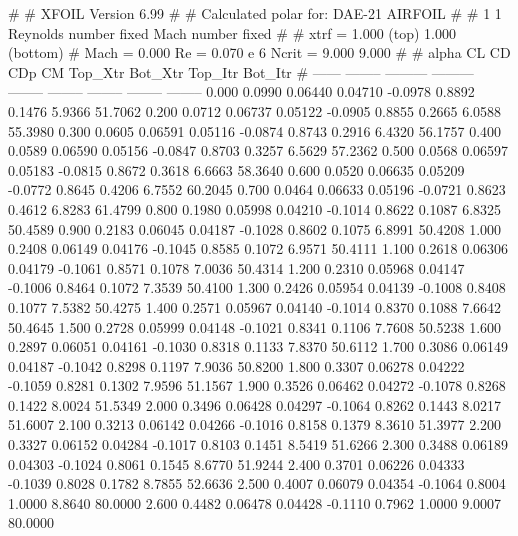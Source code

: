 #  
#       XFOIL         Version 6.99
#  
# Calculated polar for: DAE-21 AIRFOIL                                  
#  
# 1 1 Reynolds number fixed          Mach number fixed         
#  
# xtrf =   1.000 (top)        1.000 (bottom)  
# Mach =   0.000     Re =     0.070 e 6     Ncrit =   9.000  9.000
#  
#   alpha    CL        CD       CDp       CM     Top_Xtr  Bot_Xtr  Top_Itr  Bot_Itr
#  ------ -------- --------- --------- -------- -------- -------- -------- --------
   0.000   0.0990   0.06440   0.04710  -0.0978   0.8892   0.1476   5.9366  51.7062
   0.200   0.0712   0.06737   0.05122  -0.0905   0.8855   0.2665   6.0588  55.3980
   0.300   0.0605   0.06591   0.05116  -0.0874   0.8743   0.2916   6.4320  56.1757
   0.400   0.0589   0.06590   0.05156  -0.0847   0.8703   0.3257   6.5629  57.2362
   0.500   0.0568   0.06597   0.05183  -0.0815   0.8672   0.3618   6.6663  58.3640
   0.600   0.0520   0.06635   0.05209  -0.0772   0.8645   0.4206   6.7552  60.2045
   0.700   0.0464   0.06633   0.05196  -0.0721   0.8623   0.4612   6.8283  61.4799
   0.800   0.1980   0.05998   0.04210  -0.1014   0.8622   0.1087   6.8325  50.4589
   0.900   0.2183   0.06045   0.04187  -0.1028   0.8602   0.1075   6.8991  50.4208
   1.000   0.2408   0.06149   0.04176  -0.1045   0.8585   0.1072   6.9571  50.4111
   1.100   0.2618   0.06306   0.04179  -0.1061   0.8571   0.1078   7.0036  50.4314
   1.200   0.2310   0.05968   0.04147  -0.1006   0.8464   0.1072   7.3539  50.4100
   1.300   0.2426   0.05954   0.04139  -0.1008   0.8408   0.1077   7.5382  50.4275
   1.400   0.2571   0.05967   0.04140  -0.1014   0.8370   0.1088   7.6642  50.4645
   1.500   0.2728   0.05999   0.04148  -0.1021   0.8341   0.1106   7.7608  50.5238
   1.600   0.2897   0.06051   0.04161  -0.1030   0.8318   0.1133   7.8370  50.6112
   1.700   0.3086   0.06149   0.04187  -0.1042   0.8298   0.1197   7.9036  50.8200
   1.800   0.3307   0.06278   0.04222  -0.1059   0.8281   0.1302   7.9596  51.1567
   1.900   0.3526   0.06462   0.04272  -0.1078   0.8268   0.1422   8.0024  51.5349
   2.000   0.3496   0.06428   0.04297  -0.1064   0.8262   0.1443   8.0217  51.6007
   2.100   0.3213   0.06142   0.04266  -0.1016   0.8158   0.1379   8.3610  51.3977
   2.200   0.3327   0.06152   0.04284  -0.1017   0.8103   0.1451   8.5419  51.6266
   2.300   0.3488   0.06189   0.04303  -0.1024   0.8061   0.1545   8.6770  51.9244
   2.400   0.3701   0.06226   0.04333  -0.1039   0.8028   0.1782   8.7855  52.6636
   2.500   0.4007   0.06079   0.04354  -0.1064   0.8004   1.0000   8.8640  80.0000
   2.600   0.4482   0.06478   0.04428  -0.1110   0.7962   1.0000   9.0007  80.0000
